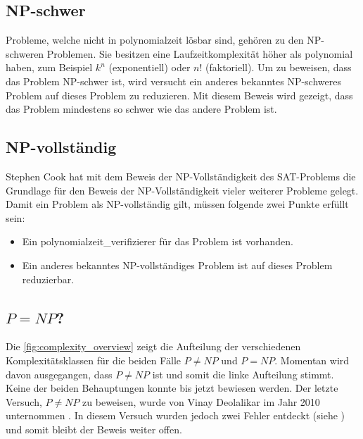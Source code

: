 \subsection{NP-schwer}\label{np_hard}
Probleme, welche nicht in \gls{polynomialzeit} lösbar sind, gehören zu den NP-schweren Problemen. Sie besitzen eine Laufzeitkomplexität höher als polynomial haben, zum Beispiel 
$k^n$ (exponentiell) oder $n!$ (faktoriell). Um zu beweisen, dass das Problem NP-schwer ist, wird versucht ein anderes bekanntes NP-schweres Problem auf dieses Problem zu reduzieren. Mit 
diesem Beweis wird gezeigt, dass das Problem mindestens so schwer wie das andere Problem ist.

\subsection{NP-vollständig}\label{np_complet}
Stephen Cook hat mit dem Beweis der NP-Vollständigkeit des SAT-Problems \cite{cook_complexity} die Grundlage für den Beweis der NP-Vollständigkeit vieler weiterer Probleme 
gelegt. Damit ein Problem als NP-vollständig gilt, müssen folgende zwei Punkte erfüllt sein:
\begin{itemize}
	\item Ein \gls{polynomialzeit_verifizierer} für das Problem ist vorhanden.
	\item Ein anderes bekanntes NP-vollständiges Problem ist auf dieses Problem reduzierbar.
\end{itemize}

\subsection{$P = NP$?}
Die \autoref{fig:complexity_overview} zeigt die Aufteilung der verschiedenen Komplexitätsklassen für die beiden Fälle $P \neq NP$ und $P=NP$. Momentan wird davon ausgegangen, 
dass $P \neq NP$ ist und somit die linke Aufteilung stimmt. Keine der beiden Behauptungen konnte bis jetzt bewiesen werden. Der letzte Versuch, $P \neq NP$ zu beweisen, wurde von 
Vinay Deolalikar im Jahr 2010 unternommen \cite{p_neq_np_paper}. In diesem Versuch wurden jedoch zwei Fehler entdeckt (siehe \cite{p_neq_np_paper_blog}) und somit bleibt der 
Beweis weiter offen.

